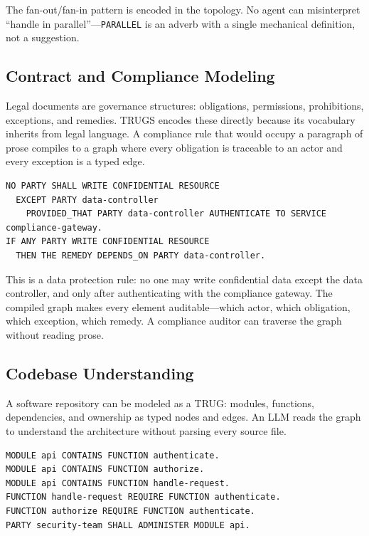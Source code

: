 \documentclass{article}
\begin{document}
The fan-out/fan-in pattern is encoded in the topology. No agent can misinterpret ``handle in parallel''---\texttt{PARALLEL} is an adverb with a single mechanical definition, not a suggestion.

\subsection{Contract and Compliance Modeling}

Legal documents are governance structures: obligations, permissions, prohibitions, exceptions, and remedies. TRUGS encodes these directly because its vocabulary inherits from legal language. A compliance rule that would occupy a paragraph of prose compiles to a graph where every obligation is traceable to an actor and every exception is a typed edge.

\begin{lstlisting}[style=trugs]
NO PARTY SHALL WRITE CONFIDENTIAL RESOURCE
  EXCEPT PARTY data-controller
    PROVIDED_THAT PARTY data-controller AUTHENTICATE TO SERVICE compliance-gateway.
IF ANY PARTY WRITE CONFIDENTIAL RESOURCE
  THEN THE REMEDY DEPENDS_ON PARTY data-controller.
\end{lstlisting}

This is a data protection rule: no one may write confidential data except the data controller, and only after authenticating with the compliance gateway. The compiled graph makes every element auditable---which actor, which obligation, which exception, which remedy. A compliance auditor can traverse the graph without reading prose.

\subsection{Codebase Understanding}

A software repository can be modeled as a TRUG: modules, functions, dependencies, and ownership as typed nodes and edges. An LLM reads the graph to understand the architecture without parsing every source file.

\begin{lstlisting}[style=trugs]
MODULE api CONTAINS FUNCTION authenticate.
MODULE api CONTAINS FUNCTION authorize.
MODULE api CONTAINS FUNCTION handle-request.
FUNCTION handle-request REQUIRE FUNCTION authenticate.
FUNCTION authorize REQUIRE FUNCTION authenticate.
PARTY security-team SHALL ADMINISTER MODULE api.
\end{lstlisting}
\end{document}
